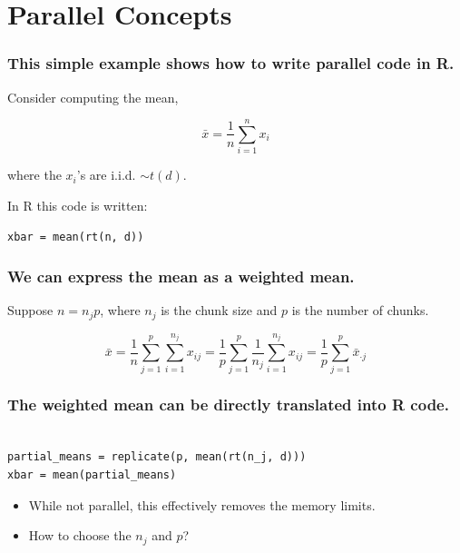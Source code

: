 \documentclass{beamer}
\begin{document}
\section{Parallel Concepts}
\begin{frame}[fragile]

\frametitle{This simple example shows how to write parallel code in R.}


Consider computing the mean,

\begin{equation}
    \bar{x} = \frac{1}{n} \sum_{i = 1}^n x_i
\label{eq:mean}
\end{equation}

where the $x_i$'s are i.i.d. $\sim t(d)$. 
    
In R this code is written:

\begin{verbatim}
xbar = mean(rt(n, d))
\end{verbatim}

\end{frame}
\begin{frame}

    \frametitle{We can express the mean as a weighted mean.}

Suppose $n = n_j p$, where $n_j$ is the chunk size and $p$ is the number of
chunks.

\begin{equation}
    \bar{x} = \frac{1}{n} \sum_{j = 1}^p \sum_{i = 1}^{n_j} x_{ij}
    = \frac{1}{p} \sum_{j = 1}^p \frac{1}{n_j} \sum_{i = 1}^{n_j} x_{ij}
    = \frac{1}{p} \sum_{j = 1}^p \bar{x}_{\cdot j}
\label{eq:mean_partial}
\end{equation}

\end{frame}
\begin{frame}[fragile]

    \frametitle{The weighted mean can be directly translated into R code.}

\begin{verbatim}

partial_means = replicate(p, mean(rt(n_j, d)))
xbar = mean(partial_means)

\end{verbatim}

\pause 

    \begin{itemize}
        \item While not parallel, this effectively removes the memory limits.
        \item How to choose the $n_j$ and $p$?
    \end{itemize}

\end{frame}
\end{document}
